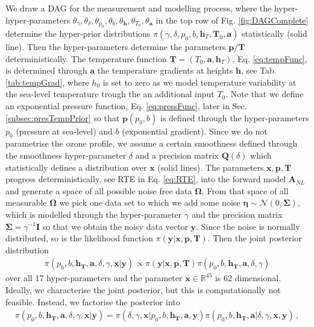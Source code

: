We draw a DAG for the measurement and modelling process, where the hyper-hyper-parameters $\theta_{\gamma}, \theta_{\delta},\theta_{p_0},\theta_{b},\theta_{\bm{h}},\theta_{T_0},\theta_{\bm{a}}$ in the top row of Fig. \ref{fig:DAGComplete} determine the hyper-prior distributions $\pi(\gamma, \delta, p_0, b, \bm{h}_T, \bm{T}_0, \bm{a})$ statistically (solid line).
Then the hyper-parameters determine the parameters $\bm{p}/\bm{T}$ deterministically.
The temperature function $\bm{T} = (T_0,\bm{a}, \bm{h}_T)$, Eq. \ref{eq:tempFunc}, is determined through $\bm{a}$ the temperature gradients at heights $\bm{h}$, see Tab. \ref{tab:tempGrad}, where $h_0$ is set to zero as we model temperature variability at the sea-level temperature trough the an additional input $T_0$.
Note that we define an exponential pressure function, Eq. \ref{eq:pressFunc}, later in Sec. \ref{subsec:presTempPrior} so that $\bm{p}(p_0,b)$ is defined through the hyper-parameters $p_0$ (pressure at sea-level) and $b$ (exponential gradient).
Since we do not parametrise the ozone profile, we assume a certain smoothness defined through the smoothness hyper-parameter $\delta$ and a precision matrix $\bm{Q}(\delta)$ which statistically defines a distribution over $\bm{x}$ (solid lines).
The parameters $\bm{x}, \bm{p},\bm{T}$ progress deterministically, see RTE in Eq. \ref{eq:RTE}, into the forward model $\bm{A}_{NL}$ and generate a space of all possible noise free data $\bm{\Omega}$.
From that space of all measurable $\bm{\Omega}$ we pick one data set to which we add some noise $\bm{\eta} \sim \mathcal{N}(0, \bm{\Sigma})$, which is modelled through the hyper-parameter $\gamma$ and the precision matrix $\bm{\Sigma} = \gamma^{-1} \bm{I}$ so that we obtain the noisy data vector $\bm{y}$.
Since the noise is normally distributed, so is the likelihood function $\pi(\bm{y} | \bm{x}, \bm{p}, \bm{T})$.
Then the joint posterior distribution
\begin{align}
	\pi(p_0,b,\bm{h_T},\bm{a},\delta, \gamma, \bm{x}| \bm{y}) \propto \pi(\bm{y} | \bm{x}, \bm{p}, \bm{T}) \pi(p_0,b,\bm{h_T},\bm{a},\delta, \gamma) 
\end{align}
over all 17 hyper-parameters and the parameter $\bm{x} \in \mathbb{R}^{45}$ is 62 dimensional.
Ideally, we characterise the joint posterior, but this is computationally not feasible.
Instead, we factorise the posterior into
\begin{align}
	\pi(p_0,b,\bm{h_T},\bm{a},\delta, \gamma, \bm{x}| \bm{y}) = \pi(\delta, \gamma, \bm{x}| p_0,b,\bm{h_T},\bm{a},\bm{y}) \pi(p_0,b,\bm{h_T},\bm{a}|\delta, \gamma, \bm{x}, \bm{y}) \, , 
\end{align}
